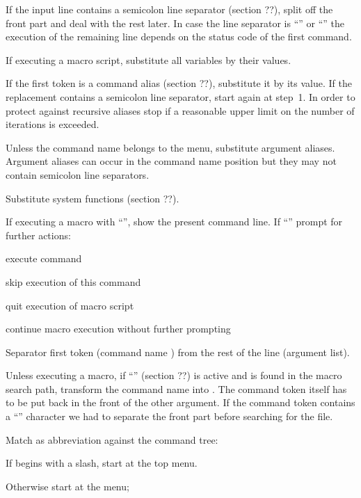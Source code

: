 \begin{OL}
\item%
If the input line contains a semicolon line separator 
(section ??), split off the front part and deal with the rest
later.
In case the line separator is ``\Lit{;&}'' or ``\Lit{;!}'' the
execution of the remaining line depends on the status code of the
first command.
\item%
If executing a macro script, substitute all variables by
their values.
\item%
If the first token is a command alias (section ??), substitute it by its value.
If the replacement contains a semicolon line separator, start again at
step~1.
In order to protect against recursive aliases stop
if a reasonable upper limit on the number of iterations is exceeded.
\item%
Unless the command name belongs to the  menu,
substitute argument aliases.
Argument aliases can occur in the command name position but they may
not contain semicolon line separators.
\item%
Substitute system functions (section ??).
\item%
If executing a macro with ``'', show the present command
line.
If ``'' prompt for further actions:
\begin{UL}
\item execute command
\item skip execution of this command
\item quit execution of macro script
\item continue macro execution without further prompting
\end{UL}
\item%
Separator first token (command name ) from the rest of the line
(argument list).
\item%
Unless executing a macro, if ``'' 
(section ??) is active
and  is found in the macro search path,
transform the command name into .
The command token itself has to be put back in the front of the
other argument.
If the command token contains a ``\Lit{\#}'' character we had to
separate the front part before searching for the  file.
\item%
Match  as abbreviation against the command tree:
\begin{UL}
\item If  begins with a slash, start at the top menu.
\item Otherwise start at the  menu;

\end{UL}
\end{OL}

